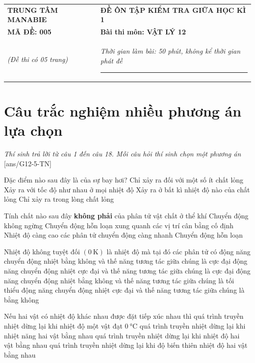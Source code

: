 \begin{tabular}{M{6.5cm}M{11cm}}
	\textbf{TRUNG TÂM MANABIE}& \textbf{ĐỀ ÔN TẬP KIỂM TRA GIỮA HỌC KÌ 1}\\
	\textbf{MÃ ĐỀ: 005}& \textbf{Bài thi môn: VẬT LÝ 12}\\
	\textit{(Đề thi có 05 trang)}& \textit{Thời gian làm bài: 50 phút, không kể thời gian phát đề}
	
	\noindent\rule{4cm}{0.8pt} \\
\end{tabular}
\setcounter{section}{0}
\section{Câu trắc nghiệm nhiều phương án lựa chọn}
\textit{Thí sinh trả lời từ câu 1 đến câu 18. Mỗi câu hỏi thí sinh chọn một phương án}
\setcounter{ex}{0}
[ans/G12-5-TN]
\begin{ex}
Đặc điểm nào sau đây là của sự bay hơi?	
	\choice
	{Chỉ xảy ra đối với một số ít chất lỏng}
	{Xảy ra với tốc độ như nhau ở mọi nhiệt độ}
	{\True Xảy ra ở bất kì nhiệt độ nào của chất lỏng}
	{Chỉ xảy ra trong lòng chất lỏng}
	\loigiai{}
\end{ex}
\begin{ex}
	Tính chất nào sau đây \textbf{không phải} của phân tử vật chất ở thể khí
	\choice
	{Chuyển động không ngừng}
	{\True Chuyển động hỗn loạn xung quanh các vị trí cân bằng cố định}
	{Nhiệt độ càng cao các phân tử chuyển động càng nhanh}
	{Chuyển động hỗn loạn}
	\loigiai{}
\end{ex}
\begin{ex}
Nhiệt độ không tuyệt đối $\left(\SI{0}{\kelvin}\right)$ là nhiệt độ mà tại đó các phân tử có	
	\choice
	{động năng chuyển động nhiệt bằng không và thế năng tương tác giữa chúng là cực đại}
	{động năng chuyển động nhiệt cực đại và thế năng tương tác giữa chúng là cực đại}
	{\True động năng chuyển động nhiệt bằng không và thế năng tương tác giữa chúng là tối thiểu}
	{động năng chuyển động nhiệt cực đại và thế năng tương tác giữa chúng là bằng không}
	\loigiai{}
\end{ex}
\begin{ex}
	Nếu hai vật có nhiệt độ khác nhau được đặt tiếp xúc nhau thì
	\choice
	{quá trình truyền nhiệt dừng lại khi nhiệt độ một vật đạt $\SI{0}{\celsius}$}
	{quá trình truyền nhiệt dừng lại khi nhiệt năng hai vật bằng nhau}
	{\True quá trình truyền nhiệt dừng lại khi nhiệt độ hai vật bằng nhau}
	{quá trình truyền nhiệt dừng lại khi độ biến thiên nhiệt độ hai vật bằng nhau}
	\loigiai{}
\end{ex}
